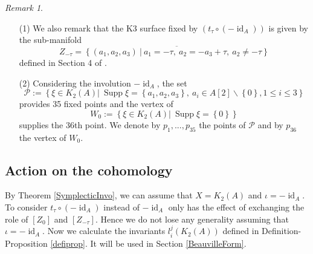 \documentclass{alggeom}
\DeclareMathOperator{\id}{id}
\DeclareMathOperator{\Supp}{Supp}
\theoremstyle{plain}
\theoremstyle{definition}
\theoremstyle{remark}
\newtheorem{rmk}[theorem]{Remark}
\begin{document}
\begin{rmk}\label{RemarkSymplecticInv}
\begin{itemize}
\item[(1)]
We also remark that the K3 surface fixed by $(t_\tau \circ (-\id_A))$ is given by the sub-manifold $$Z_{-\tau}=\overline{\left\{\left.(a_1,a_2,a_3)\ \right|\ a_1=-\tau,\ a_2=-a_3+\tau,\ a_2\neq -\tau\right\}}$$ defined in Section 4 of \cite{Hassett}. 
\item[(2)]
Considering the involution $-\id_A$,
the set $$\mathcal{P}:=\left\{\left.\xi\in K_{2}(A)\right|\ \Supp \xi= \left\{a_{1},a_{2},a_{3}\right\},\ a_{i}\in A[2]\smallsetminus \left\{0\right\}, 1\leq i\leq 3 \right\}$$ provides 35 fixed points and the vertex of $$W_{0}:=\left\{\left.\xi\in K_{2}(A)\right|\ \Supp \xi=\left\{0\right\}\right\}$$ supplies the 36th point. We denote by $p_1,...,p_{35}$ the points of $\mathcal{P}$ and by $p_{36}$ the vertex of $W_{0}$.
\end{itemize}
\end{rmk}

\subsection{Action on the cohomology}\label{actioncoh}
By Theorem \ref{SymplecticInvo}, we can assume that $X=K_2(A)$ and $\iota=-\id_A$. To consider $t_\tau \circ (-\id_A)$ instead of  $-\id_A$ only has the effect of exchanging the role of $[Z_0]$ and $[Z_{-\tau}]$.
Hence we do not lose any generality assuming that $\iota=-\id_A$. Now we calculate the invariants $l_i^j(K_{2}(A))$ defined in Definition-Proposition \ref{defiprop}. It will be used in Section \ref{BeauvilleForm}.
\end{document}
